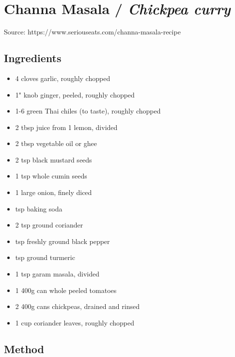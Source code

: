 \section{Channa Masala / \emph{Chickpea curry}}


Source: https://www.seriouseats.com/channa-masala-recipe

\subsection{Ingredients}

\begin{itemize}
    \item 4 cloves garlic, roughly chopped
    \item 1" knob ginger, peeled, roughly chopped
    \item 1-6 green Thai chiles (to taste), roughly chopped
    \item 2 tbsp juice from 1 lemon, divided
    \item 2 tbsp vegetable oil or ghee
    \item 2 tsp black mustard seeds
    \item 1 tsp whole cumin seeds
    \item 1 large onion, finely diced
    \item {} tsp baking soda
    \item 2 tsp ground coriander
    \item {} tsp freshly ground black pepper
    \item {} tsp ground turmeric
    \item 1 tsp garam masala, divided
    \item 1 400g can whole peeled tomatoes
    \item 2 400g cans chickpeas, drained and rinsed
    \item 1 cup coriander leaves, roughly chopped
\end{itemize}

\subsection{Method}

